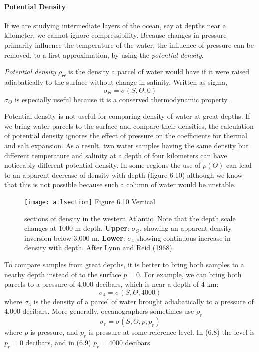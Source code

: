 \paragraph{Potential Density}
If we
are studying intermediate layers of the ocean, say at depths near a
kilometer, we cannot ignore compressibility. Because changes in
pressure primarily influence the temperature of the water, the
influence of pressure can be removed, to a first approximation, by
using the \textit{potential density}.

\textit{Potential density} $\rho _{\Theta}$ is the density a parcel of
water would have if it were raised adiabatically to the surface
without change in salinity. Written as sigma,
\begin{equation}
\sigma _{\Theta} = \sigma(S, \Theta, 0)
\end{equation}
$\sigma _{\Theta}$ is especially useful because it is a conserved
thermodynamic property.

Potential density is not useful for comparing density of water at
great depths. If we bring water parcels to the surface and compare
their densities, the calculation of potential density ignores the
effect of pressure on the coefficients for thermal and salt
expansion. As a result, two water samples having the same density but
different temperature and salinity at a depth of four kilometers can
have noticeably different potential density. In some regions the use
of $\rho(\Theta)$ can lead to an apparent decrease of density with
depth (figure 6.10) although we know that this is not possible because
such a column of water would be unstable.

\begin{figure}[b!]
\vspace{-2ex}
\texttt{[image: atlsection]}
\footnotesize
Figure 6.10 Vertical \rule{0mm}{4ex}sections of density in the western
Atlantic.  Note that the depth scale changes at 1000 m
depth. \textbf{Upper}: $\sigma _{\Theta}$, showing an apparent density
inversion below 3,000 m. \textbf{Lower}: $\sigma _4$ showing
continuous increase in density with depth. After Lynn and Reid (1968).
\label{fig:atlsection4}
\end{figure}

To compare samples from great depths, it is better to bring both
samples to a nearby depth instead of to the surface $p = 0$. For
example, we can bring both parcels to a pressure of 4,000 decibars,
which is near a depth of 4 km:
\begin{equation}
\sigma_4 = \sigma(S, \Theta, 4000)
\end{equation}
where $\sigma_4$ is the density of a parcel of water brought
adiabatically to a pressure of 4,000 decibars. More generally,
oceanographers sometimes use $\rho_r$
\begin{equation}
\sigma _r = \sigma(S, \Theta, p, p_r)
\end{equation}
where $p$ is pressure, and $p_r$ is pressure at some reference
level. In (6.8) the level is $p_r = 0$ decibars, and in (6.9)
$p_r = 4000$ decibars.

